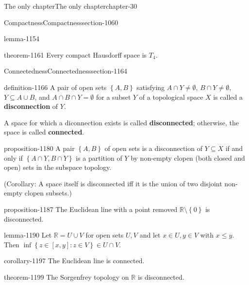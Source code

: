 \documentclass[oneside,10pt,]{book}
\newcommand{\terminology}[1]{\textbf{#1}}
\newcommand{\mb}{\mathbb}
\newcommand{\setBuilder}[2]{\left\{#1:#2\right\}}
\newcommand{\setList}[1]{\left\{#1\right\}}
\begin{document}
\begin{chapterptx}{The only chapter}{}{The only chapter}{}{}{chapter-30}
\begin{sectionptx}{Compactness}{}{Compactness}{}{}{section-1060}
\begin{lemma}{}{}{lemma-1154}
\end{lemma}
\begin{theorem}{}{}{theorem-1161}%
\hypertarget{p-1162}{}%
Every compact Hausdorff space is \(T_4\).%
\end{theorem}
\end{sectionptx}
%
%
\typeout{************************************************}
\typeout{************************************************}
%
\begin{sectionptx}{Connectedness}{}{Connectedness}{}{}{section-1164}
\begin{definition}{}{definition-1166}%
\hypertarget{p-1167}{}%
A pair of open sets \(\setList{A,B}\) satisfying \(A\cap Y\not=\emptyset\), \(B\cap Y\not=\emptyset\), \(Y\subseteq A\cup B\), and \(A\cap B\cap Y=\emptyset\) for a subset \(Y\) of a topological space \(X\) is called a \terminology{disconnection} of \(Y\).%
\par
\hypertarget{p-1177}{}%
A space for which a diconnection exists is called \terminology{disconnected}; otherwise, the space is called \terminology{connected}.%
\end{definition}
\begin{proposition}{}{}{proposition-1180}%
\hypertarget{p-1181}{}%
A pair \(\setList{A,B}\) of open sets is a disconnection of \(Y\subseteq X\) if and only if \(\setList{A\cap Y,B\cap Y}\) is a partition of \(Y\) by non-empty clopen (both closed and open) sets in the subspace topology.%
\end{proposition}
\hypertarget{p-1186}{}%
(Corollary: A space itself is disconnected iff it is the union of two disjoint non-empty clopen subsets.)%
\begin{proposition}{}{}{proposition-1187}%
\hypertarget{p-1188}{}%
The Euclidean line with a point removed \(\mb R\setminus\setList{0}\) is disconnected.%
\end{proposition}
\begin{lemma}{}{}{lemma-1190}%
\hypertarget{p-1191}{}%
Let \(\mb R=U\cup V\) for open sets \(U,V\) and let \(x\in U,y\in V\) with \(x\leq y\).  Then \(\inf\setBuilder{z\in[x,y]}{z\in V}\in U\cap V\).%
\end{lemma}
\begin{corollary}{}{}{corollary-1197}%
\hypertarget{p-1198}{}%
The Euclidean line is connected.%
\end{corollary}
\begin{theorem}{}{}{theorem-1199}%
\hypertarget{p-1200}{}%
The Sorgenfrey topology on \(\mb R\) is disconnected.%

\end{theorem}
\end{sectionptx}
\end{chapterptx}
\end{document}
